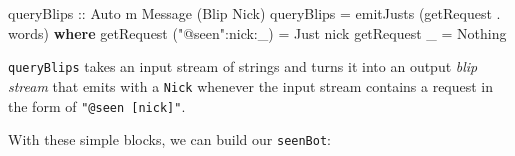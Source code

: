 \documentclass[]{article}
\newenvironment{Shaded}{}{}
\newcommand{\KeywordTok}[1]{\textcolor[rgb]{0.00,0.44,0.13}{\textbf{{#1}}}}
\newcommand{\DataTypeTok}[1]{\textcolor[rgb]{0.56,0.13,0.00}{{#1}}}
\newcommand{\StringTok}[1]{\textcolor[rgb]{0.25,0.44,0.63}{{#1}}}
\newcommand{\OtherTok}[1]{\textcolor[rgb]{0.00,0.44,0.13}{{#1}}}
\newcommand{\FunctionTok}[1]{\textcolor[rgb]{0.02,0.16,0.49}{{#1}}}
\newcommand{\NormalTok}[1]{{#1}}
\begin{document}
\begin{Shaded}
\begin{Highlighting}[]
\OtherTok{queryBlips ::} \DataTypeTok{Auto} \NormalTok{m }\DataTypeTok{Message} \NormalTok{(}\DataTypeTok{Blip} \DataTypeTok{Nick}\NormalTok{)}
\NormalTok{queryBlips }\FunctionTok{=} \NormalTok{emitJusts (getRequest }\FunctionTok{.} \NormalTok{words)}
  \KeywordTok{where}
    \NormalTok{getRequest (}\StringTok{"@seen"}\FunctionTok{:}\NormalTok{nick}\FunctionTok{:}\NormalTok{_) }\FunctionTok{=} \DataTypeTok{Just} \NormalTok{nick}
    \NormalTok{getRequest _                }\FunctionTok{=} \DataTypeTok{Nothing}
\end{Highlighting}
\end{Shaded}

\texttt{queryBlips} takes an input stream of strings and turns it into
an output \emph{blip stream} that emits with a \texttt{Nick} whenever
the input stream contains a request in the form of
\texttt{"@seen\ {[}nick{]}"}.

With these simple blocks, we can build our \texttt{seenBot}:
\end{document}
